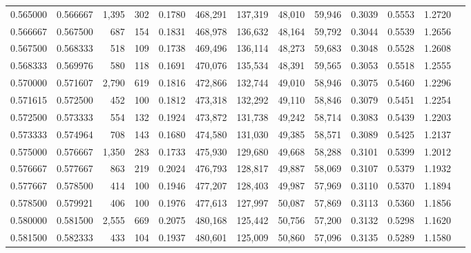 \begin{tabular}{rrrrrrrrrrrrr}
0.565000 & 0.566667 & 1,395 & 302 &                                     0.1780 & 468,291 & 137,319 &  48,010 &  59,946 & 0.3039 & 0.5553 & 1.2720 \\
0.566667 & 0.567500 &   687 & 154 &                                     0.1831 & 468,978 & 136,632 &  48,164 &  59,792 & 0.3044 & 0.5539 & 1.2656 \\
0.567500 & 0.568333 &   518 & 109 &                                     0.1738 & 469,496 & 136,114 &  48,273 &  59,683 & 0.3048 & 0.5528 & 1.2608 \\
0.568333 & 0.569976 &   580 & 118 &                                     0.1691 & 470,076 & 135,534 &  48,391 &  59,565 & 0.3053 & 0.5518 & 1.2555 \\
0.570000 & 0.571607 & 2,790 & 619 &                                     0.1816 & 472,866 & 132,744 &  49,010 &  58,946 & 0.3075 & 0.5460 & 1.2296 \\
0.571615 & 0.572500 &   452 & 100 &                                     0.1812 & 473,318 & 132,292 &  49,110 &  58,846 & 0.3079 & 0.5451 & 1.2254 \\
0.572500 & 0.573333 &   554 & 132 &                                     0.1924 & 473,872 & 131,738 &  49,242 &  58,714 & 0.3083 & 0.5439 & 1.2203 \\
0.573333 & 0.574964 &   708 & 143 &                                     0.1680 & 474,580 & 131,030 &  49,385 &  58,571 & 0.3089 & 0.5425 & 1.2137 \\
0.575000 & 0.576667 & 1,350 & 283 &                                     0.1733 & 475,930 & 129,680 &  49,668 &  58,288 & 0.3101 & 0.5399 & 1.2012 \\
0.576667 & 0.577667 &   863 & 219 &                                     0.2024 & 476,793 & 128,817 &  49,887 &  58,069 & 0.3107 & 0.5379 & 1.1932 \\
0.577667 & 0.578500 &   414 & 100 &                                     0.1946 & 477,207 & 128,403 &  49,987 &  57,969 & 0.3110 & 0.5370 & 1.1894 \\
0.578500 & 0.579921 &   406 & 100 &                                     0.1976 & 477,613 & 127,997 &  50,087 &  57,869 & 0.3113 & 0.5360 & 1.1856 \\
0.580000 & 0.581500 & 2,555 & 669 &                                     0.2075 & 480,168 & 125,442 &  50,756 &  57,200 & 0.3132 & 0.5298 & 1.1620 \\
0.581500 & 0.582333 &   433 & 104 &                                     0.1937 & 480,601 & 125,009 &  50,860 &  57,096 & 0.3135 & 0.5289 & 1.1580 \\

\end{tabular}
